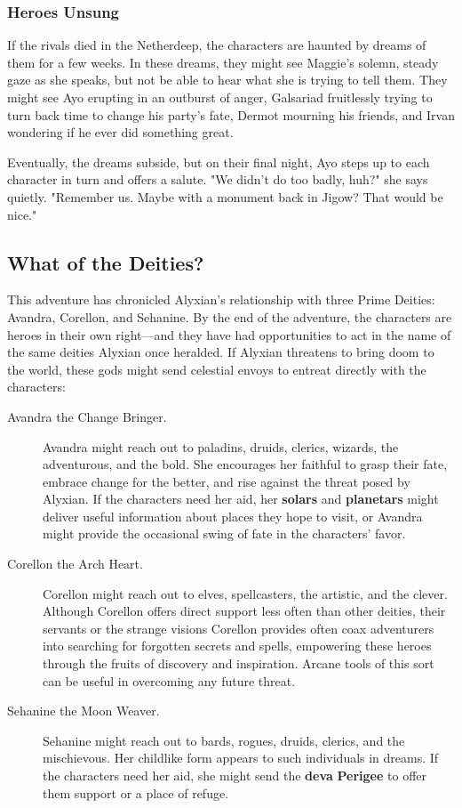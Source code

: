 \documentclass[letterpaper, 11pt, bg=full, twocolumn]{dndbook}
\begin{document}
\subsubsection{Heroes Unsung}

If the rivals died in the Netherdeep, the characters are haunted by dreams of them for a few weeks. In these dreams, they might see Maggie's solemn, steady gaze as she speaks, but not be able to hear what she is trying to tell them. They might see Ayo erupting in an outburst of anger, Galsariad fruitlessly trying to turn back time to change his party's fate, Dermot mourning his friends, and Irvan wondering if he ever did something great.

Eventually, the dreams subside, but on their final night, Ayo steps up to each character in turn and offers a salute. "We didn't do too badly, huh?" she says quietly. "Remember us. Maybe with a monument back in Jigow? That would be nice."

\subsection{What of the Deities?}

This adventure has chronicled Alyxian's relationship with three Prime Deities: Avandra, Corellon, and Sehanine. By the end of the adventure, the characters are heroes in their own right---and they have had opportunities to act in the name of the same deities Alyxian once heralded. If Alyxian threatens to bring doom to the world, these gods might send celestial envoys to entreat directly with the characters:

\begin{description}
\item[Avandra the Change Bringer.] Avandra might reach out to paladins, druids, clerics, wizards, the adventurous, and the bold. She encourages her faithful to grasp their fate, embrace change for the better, and rise against the threat posed by Alyxian. If the characters need her aid, her \textbf{solars} and \textbf{planetars} might deliver useful information about places they hope to visit, or Avandra might provide the occasional swing of fate in the characters' favor.
\item[Corellon the Arch Heart.] Corellon might reach out to elves, spellcasters, the artistic, and the clever. Although Corellon offers direct support less often than other deities, their servants or the strange visions Corellon provides often coax adventurers into searching for forgotten secrets and spells, empowering these heroes through the fruits of discovery and inspiration. Arcane tools of this sort can be useful in overcoming any future threat.
\item[Sehanine the Moon Weaver.] Sehanine might reach out to bards, rogues, druids, clerics, and the mischievous. Her childlike form appears to such individuals in dreams. If the characters need her aid, she might send the \textbf{deva} \textbf{Perigee} to offer them support or a place of refuge.
\end{description}
\end{document}
